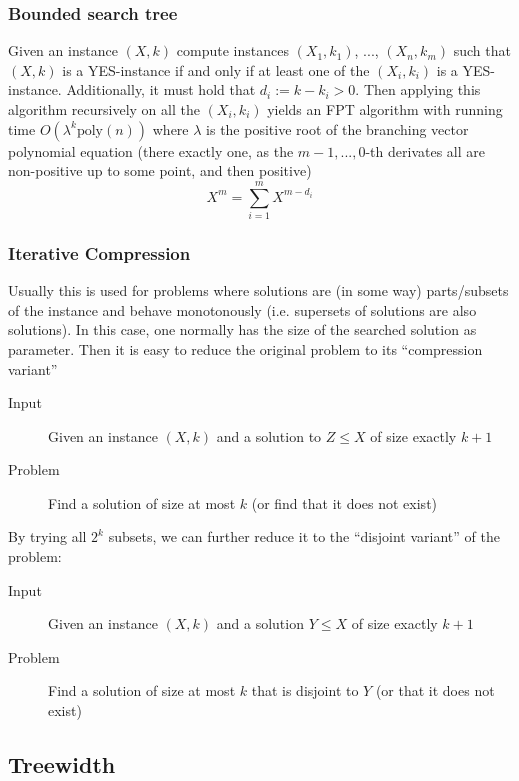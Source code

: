 \documentclass{scrartcl}
\begin{document}
\subsubsection*{Bounded search tree}

Given an instance $(X, k)$ compute instances $(X_1, k_1)$, ..., $(X_n, k_m)$ such that $(X, k)$ is a YES-instance if and only if at least one of the $(X_i, k_i)$ is a YES-instance. Additionally, it must hold that $d_i := k - k_i > 0$.
Then applying this algorithm recursively on all the $(X_i, k_i)$ yields an FPT algorithm with running time $O(\lambda^k \mathrm{poly}(n))$ where $\lambda$ is the positive root of the branching vector polynomial equation (there exactly one, as the $m-1, ..., 0$-th derivates all are non-positive up to some point, and then positive)
\begin{equation*}
    X^m = \sum_{i = 1}^m X^{m - d_i}
\end{equation*}

\subsubsection*{Iterative Compression}

Usually this is used for problems where solutions are (in some way) parts/subsets of the instance and behave monotonously (i.e. supersets of solutions are also solutions).
In this case, one normally has the size of the searched solution as parameter.
Then it is easy to reduce the original problem to its ``compression variant''
\begin{description}
    \item[Input] Given an instance $(X, k)$ and a solution to $Z \leq X$ of size exactly $k + 1$
    \item[Problem] Find a solution of size at most $k$ (or find that it does not exist)
\end{description}
By trying all $2^k$ subsets, we can further reduce it to the ``disjoint variant'' of the problem:
\begin{description}
    \item[Input] Given an instance $(X, k)$ and a solution $Y \leq X$ of size exactly $k + 1$
    \item[Problem] Find a solution of size at most $k$ that is disjoint to $Y$ (or that it does not exist) 
\end{description}

\subsection{Treewidth}
\end{document}
